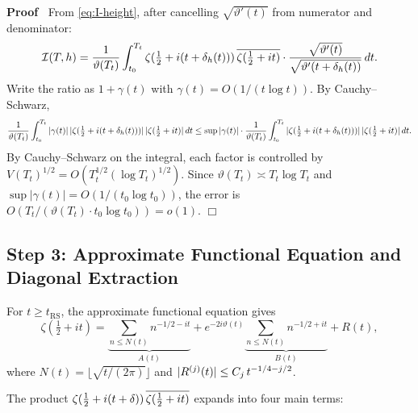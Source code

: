 \documentclass{article}
\newenvironment{proof}{\noindent\textbf{Proof\ }}{\hspace*{\fill}$\Box$\medskip}
\begin{document}
\begin{proof}
  From \eqref{eq:I-height}, after cancelling $\sqrt{\vartheta' (t)}$ from
  numerator and denominator:
  \[ \mathcal{I} (T, h) = \frac{1}{\vartheta (T_t)}  \int_{t_0}^{T_t} \zeta
     (\tfrac{1}{2} + i (t + \delta_h (t))) \hspace{0.17em} \overline{\zeta
     (\tfrac{1}{2} + it)} \cdot \frac{\sqrt{\vartheta' (t)}}{\sqrt{\vartheta' 
     (t + \delta_h (t))}}  \hspace{0.17em} dt. \]
  Write the ratio as $1 + \gamma (t)$ with $\gamma (t) = O (1 / (t \log t))$.
  By Cauchy--Schwarz,
  \[ \frac{1}{\vartheta (T_t)}  \int_{t_0}^{T_t} | \gamma (t) |
     \hspace{0.17em} | \zeta (\tfrac{1}{2} + i (t + \delta_h (t))) |
     \hspace{0.17em} | \zeta (\tfrac{1}{2} + it) | \hspace{0.17em} dt \le \sup
     | \gamma (t) | \cdot \frac{1}{\vartheta (T_t)}  \int_{t_0}^{T_t} | \zeta
     (\tfrac{1}{2} + i (t + \delta_h (t))) | \hspace{0.17em} | \zeta
     (\tfrac{1}{2} + it) |  \hspace{0.17em} dt. \]
  By Cauchy--Schwarz on the integral, each factor is controlled by $V (T_t)^{1
  / 2} = O (T_t^{1 / 2} (\log T_t)^{1 / 2})$. Since $\vartheta (T_t) \asymp
  T_t \log T_t$ and $\sup | \gamma (t) | = O (1 / (t_0 \log t_0))$, the error
  is $O (T_t / (\vartheta (T_t) \cdot t_0 \log t_0)) = o (1)$.
\end{proof}

\subsection*{Step 3: Approximate Functional Equation and Diagonal Extraction}

For $t \ge t_{\mathrm{RS}}$, the approximate functional equation gives
\begin{equation}
  \label{eq:AFE} \zeta (\tfrac{1}{2} + it) = \underbrace{\sum_{n \le N (t)}
  n^{- 1 / 2 - it}}_{A (t)} + e^{- 2 i \vartheta (t)} \underbrace{\sum_{n \le
  N (t)} n^{- 1 / 2 + it}}_{B (t)} + R (t),
\end{equation}
where $N (t) = \lfloor \sqrt{t / (2 \pi)} \rfloor$ and $|R^{(j)} (t) | \le C_j
\hspace{0.17em} t^{- 1 / 4 - j / 2}$.

The product $\zeta (\tfrac{1}{2} + i (t + \delta)) \hspace{0.17em}
\overline{\zeta (\tfrac{1}{2} + it)}$ expands into four main terms:
\end{document}
